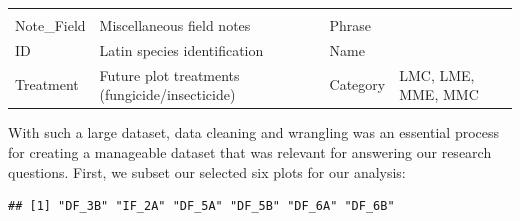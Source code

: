 \documentclass[
  12pt,
]{article}
\begin{document}
\begin{longtable}[]{@{}llll@{}}
\begin{minipage}[t]{0.18\columnwidth}
\end{minipage}\tabularnewline
\begin{minipage}[t]{0.18\columnwidth}\raggedright
Note\_Field\strut
\end{minipage} & \begin{minipage}[t]{0.35\columnwidth}\raggedright
Miscellaneous field notes\strut
\end{minipage} & \begin{minipage}[t]{0.18\columnwidth}\raggedright
Phrase\strut
\end{minipage} & \begin{minipage}[t]{0.18\columnwidth}\raggedright
\strut
\end{minipage}\tabularnewline
\begin{minipage}[t]{0.18\columnwidth}\raggedright
ID\strut
\end{minipage} & \begin{minipage}[t]{0.35\columnwidth}\raggedright
Latin species identification\strut
\end{minipage} & \begin{minipage}[t]{0.18\columnwidth}\raggedright
Name\strut
\end{minipage} & \begin{minipage}[t]{0.18\columnwidth}\raggedright
\strut
\end{minipage}\tabularnewline
\begin{minipage}[t]{0.18\columnwidth}\raggedright
Treatment\strut
\end{minipage} & \begin{minipage}[t]{0.35\columnwidth}\raggedright
Future plot treatments (fungicide/insecticide)\strut
\end{minipage} & \begin{minipage}[t]{0.18\columnwidth}\raggedright
Category\strut
\end{minipage} & \begin{minipage}[t]{0.18\columnwidth}\raggedright
LMC, LME, MME, MMC\strut
\end{minipage}\tabularnewline
\bottomrule
\end{longtable}

With such a large dataset, data cleaning and wrangling was an essential
process for creating a manageable dataset that was relevant for
answering our research questions. First, we subset our selected six
plots for our analysis:

\begin{verbatim}
## [1] "DF_3B" "IF_2A" "DF_5A" "DF_5B" "DF_6A" "DF_6B"
\end{verbatim}
\end{document}
